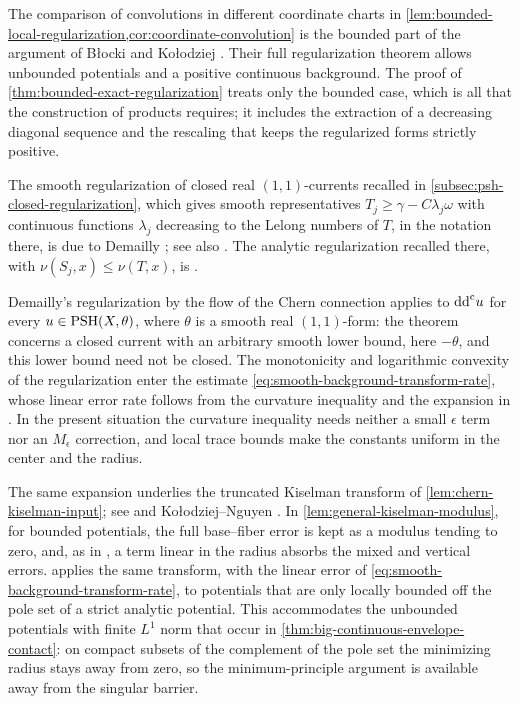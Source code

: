The comparison of convolutions in different coordinate charts in \cref{lem:bounded-local-regularization,cor:coordinate-convolution} is the bounded part of the argument of B{\l}ocki and Ko{\l}odziej \cite[\S2, Lemmas~4--5, pp.~2091--2092]{BK07}. Their full regularization theorem \cite[Theorem~1, p.~2089]{BK07} allows unbounded potentials and a positive continuous background. The proof of \cref{thm:bounded-exact-regularization} treats only the bounded case, which is all that the construction of products requires; it includes the extraction of a decreasing diagonal sequence and the rescaling that keeps the regularized forms strictly positive.

The smooth regularization of closed real $(1,1)$-currents recalled in \cref{subsec:psh-closed-regularization}, which gives smooth representatives $T_j\geq\gamma-C\lambda_j\omega$ with continuous functions $\lambda_j$ decreasing to the Lelong numbers of $T$, in the notation there, is due to Demailly \cite[Main Theorem~1.1]{Dem92}; see also \cite[Theorem~4.1]{Dem94}. The analytic regularization recalled there, with $\nu(S_j,x)\leq\nu(T,x)$, is \cite[Corollary~14.13]{DemAM11}.

Demailly's regularization by the flow of the Chern connection \cite[Theorem~4.1]{Dem94} applies to $\mathrm{dd}^{\mathrm{c}} u$ for every $u\in\mathrm{PSH}(X,\theta)$, where $\theta$ is a smooth real $(1,1)$-form: the theorem concerns a closed current with an arbitrary smooth lower bound, here $-\theta$, and this lower bound need not be closed. The monotonicity and logarithmic convexity of the regularization enter the estimate \eqref{eq:smooth-background-transform-rate}, whose linear error rate follows from the curvature inequality \cite[Lemma~4.2, p.~119]{Dem94} and the expansion in \cite[Proposition~3.1, equations (3.19), (4.21), and (4.22)]{Dem94}. In the present situation the curvature inequality needs neither a small $\epsilon$ term nor an $M_\epsilon$ correction, and local trace bounds make the constants uniform in the center and the radius.

The same expansion underlies the truncated Kiselman transform of \cref{lem:chern-kiselman-input}; see \cite[Theorem~4.1 and Remark~4.4]{Dem94} and Ko{\l}odziej--Nguyen \cite[Lemma~4.1, p.~294]{KN19}. In \cref{lem:general-kiselman-modulus}, for bounded potentials, the full base--fiber error is kept as a modulus tending to zero, and, as in \cite[Remark~4.4]{Dem94}, a term linear in the radius absorbs the mixed and vertical errors.  applies the same transform, with the linear error of \eqref{eq:smooth-background-transform-rate}, to potentials that are only locally bounded off the pole set of a strict analytic potential. This accommodates the unbounded potentials with finite $L^1$ norm that occur in \cref{thm:big-continuous-envelope-contact}: on compact subsets of the complement of the pole set the minimizing radius stays away from zero, so the minimum-principle argument is available away from the singular barrier.

